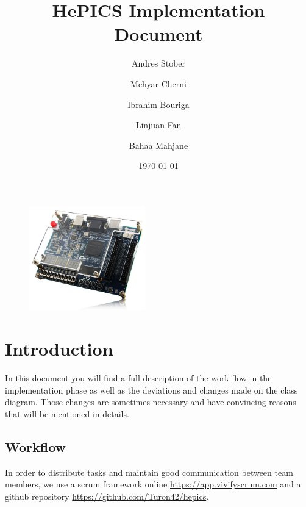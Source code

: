 \documentclass[parskip=full]{scrartcl}
\title{\Huge \textbf{HePICS Implementation Document}}
\date{\today \vspace{+10ex}}
\author{Andres Stober \\
	\and Mehyar Cherni \\
	\and Ibrahim Bouriga \\ 
	\and Linjuan Fan \\
	\and Bahaa Mahjane \\ }
\newcommand\tab[1][1cm]{\hspace*{#1}}
\begin{document}
\maketitle
\thispagestyle{empty}


\begin{figure}[b]
\centering
\includegraphics[width=0.45\textwidth, center]{boardimage}
\end{figure}

\pagebreak

\tableofcontents
\thispagestyle{empty}
\pagebreak



\section {Introduction}
	\tab In this document you will find a full description of the work flow in the implementation phase as well as the deviations and changes made on the class diagram. Those changes are sometimes necessary and have convincing reasons that will be mentioned in details.
	\subsection{Workflow}
	\tab In order to distribute tasks and maintain good communication between team members, we use a scrum framework online 	\url{https://app.vivifyscrum.com} and a github repository \url{https://github.com/Turon42/hepics}.
	
\end{document}

